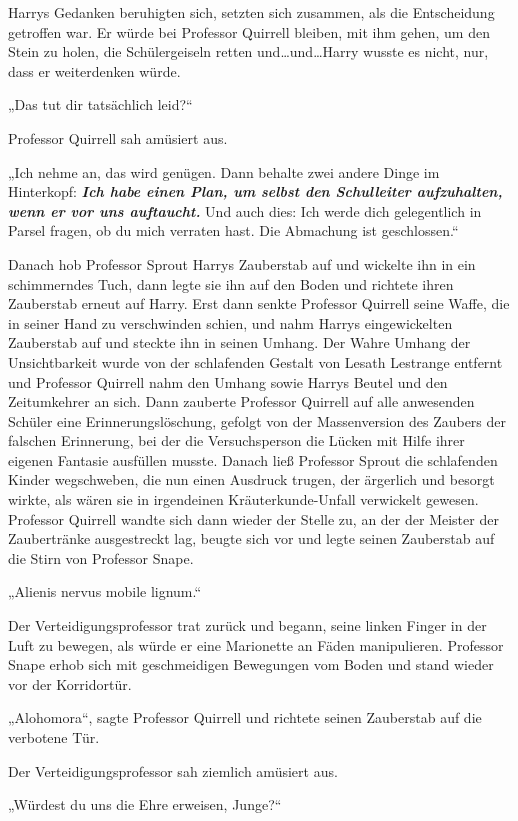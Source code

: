 {Harrys Gedanken beruhigten sich, setzten sich zusammen, als die Entscheidung getroffen war. Er würde bei Professor Quirrell bleiben, mit ihm gehen, um den Stein zu holen, die Schülergeiseln retten und…und…Harry wusste es nicht, nur, dass er weiterdenken würde.

„Das tut dir tatsächlich leid?“

Professor Quirrell sah amüsiert aus.

„Ich nehme an, das wird genügen. Dann behalte zwei andere Dinge im Hinterkopf: \textbf{\emph{Ich habe einen Plan, um selbst den Schulleiter aufzuhalten, wenn er vor uns auftaucht.}} Und auch dies: Ich werde dich gelegentlich in Parsel fragen, ob du mich verraten hast. Die Abmachung ist geschlossen.“

Danach hob Professor Sprout Harrys Zauberstab auf und wickelte ihn in ein schimmerndes Tuch, dann legte sie ihn auf den Boden und richtete ihren Zauberstab erneut auf Harry. Erst dann senkte Professor Quirrell seine Waffe, die in seiner Hand zu verschwinden schien, und nahm Harrys eingewickelten Zauberstab auf und steckte ihn in seinen Umhang. Der Wahre Umhang der Unsichtbarkeit wurde von der schlafenden Gestalt von Lesath Lestrange entfernt und Professor Quirrell nahm den Umhang sowie Harrys Beutel und den Zeitumkehrer an sich. Dann zauberte Professor Quirrell auf alle anwesenden Schüler eine Erinnerungslöschung, gefolgt von der Massenversion des Zaubers der falschen Erinnerung, bei der die Versuchsperson die Lücken mit Hilfe ihrer eigenen Fantasie ausfüllen musste. Danach ließ Professor Sprout die schlafenden Kinder wegschweben, die nun einen Ausdruck trugen, der ärgerlich und besorgt wirkte, als wären sie in irgendeinen Kräuterkunde-Unfall verwickelt gewesen. Professor Quirrell wandte sich dann wieder der Stelle zu, an der der Meister der Zaubertränke ausgestreckt lag, beugte sich vor und legte seinen Zauberstab auf die Stirn von Professor Snape.

„Alienis nervus mobile lignum.“

Der Verteidigungsprofessor trat zurück und begann, seine linken Finger in der Luft zu bewegen, als würde er eine Marionette an Fäden manipulieren. Professor Snape erhob sich mit geschmeidigen Bewegungen vom Boden und stand wieder vor der Korridortür.

„Alohomora“, sagte Professor Quirrell und richtete seinen Zauberstab auf die verbotene Tür.

Der Verteidigungsprofessor sah ziemlich amüsiert aus.

„Würdest du uns die Ehre erweisen, Junge?“

}
